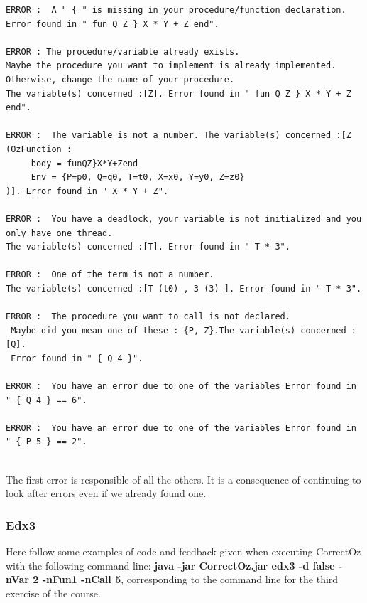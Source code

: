 \documentclass[11pt,a4paper,twoside,openright]{report}
\begin{document}
\begin{lstlisting}
ERROR :  A " { " is missing in your procedure/function declaration. 
Error found in " fun Q Z } X * Y + Z end".

ERROR : The procedure/variable already exists. 
Maybe the procedure you want to implement is already implemented. 
Otherwise, change the name of your procedure. 
The variable(s) concerned :[Z]. Error found in " fun Q Z } X * Y + Z end".

ERROR :  The variable is not a number. The variable(s) concerned :[Z (OzFunction : 
	 body = funQZ}X*Y+Zend
	 Env = {P=p0, Q=q0, T=t0, X=x0, Y=y0, Z=z0}
)]. Error found in " X * Y + Z".

ERROR :  You have a deadlock, your variable is not initialized and you only have one thread. 
The variable(s) concerned :[T]. Error found in " T * 3".

ERROR :  One of the term is not a number. 
The variable(s) concerned :[T (t0) , 3 (3) ]. Error found in " T * 3".

ERROR :  The procedure you want to call is not declared.
 Maybe did you mean one of these : {P, Z}.The variable(s) concerned :[Q]. 
 Error found in " { Q 4 }".

ERROR :  You have an error due to one of the variables Error found in " { Q 4 } == 6".

ERROR :  You have an error due to one of the variables Error found in " { P 5 } == 2".


\end{lstlisting}

The first error is responsible of all the others. It is a consequence of continuing
to look after errors even if we already found one.

\subsubsection{Edx3}
Here follow some examples of code and feedback given when executing CorrectOz
 with the following command line: \textbf{java -jar CorrectOz.jar edx3 -d 
false -nVar 2 -nFun1 -nCall 5}, corresponding to the command line for the 
third exercise of the course.
\end{document}
